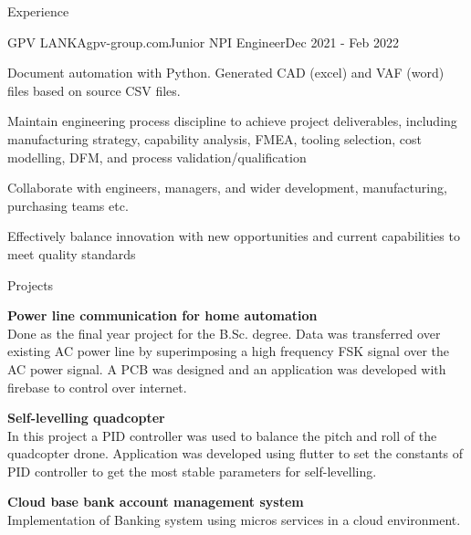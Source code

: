 \documentclass[
	11pt, %
]{./assets/resume} %
\begin{document}
\begin{rSection}{Experience}
    \pagebreak

	\begin{rSubsectionX}{GPV LANKA}{gpv-group.com}{Junior NPI Engineer}{Dec 2021 - Feb 2022}
		\item Document automation with Python. Generated CAD (excel) and VAF (word) files based on source CSV files.
        \item Maintain engineering process discipline to achieve project deliverables, including manufacturing strategy, capability analysis, FMEA, tooling selection, cost modelling, DFM, and process validation/qualification 
        \item Collaborate with engineers, managers, and wider development, manufacturing, purchasing teams etc.
        \item Effectively balance innovation with new opportunities and current capabilities to meet quality standards
	\end{rSubsectionX}

\end{rSection}


\begin{rSection}{Projects}

	\textbf{Power line communication for home automation} \\
	Done as the final year project for the B.Sc. degree. Data was transferred over existing AC power line by superimposing a high frequency FSK signal over the AC power signal. A PCB was designed and an application was developed with firebase to control over internet.

    \textbf{Self-levelling quadcopter} \\
    In this project a PID controller was used to balance the pitch and roll of the quadcopter drone. Application was developed using flutter to set the constants of PID controller to get the most stable parameters for self-levelling.

	\textbf{Cloud base bank account management system} \\
	Implementation of Banking system using micros services in a cloud environment.

\end{rSection}

\end{document}
